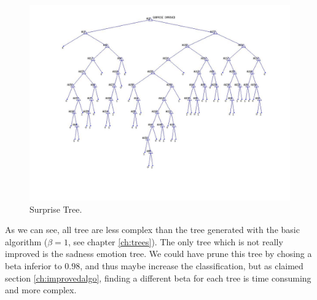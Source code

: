 \documentclass[a4paper,12pt,oneside,final]{report}
\newenvironment{changemargin}[2]{\begin{list}{}{%
\setlength{\topsep}{0pt}%
\setlength{\leftmargin}{0pt}%
\setlength{\rightmargin}{0pt}%
\setlength{\listparindent}{\parindent}%
\setlength{\itemindent}{\parindent}%
\setlength{\parsep}{0pt plus 1pt}%
\addtolength{\leftmargin}{#1}%
\addtolength{\rightmargin}{#2}%
}\item }{\end{list}}
\begin{document}
\begin{appendices}
\begin{figure}[!h]
\begin{changemargin}{-25mm}{-25mm}
\center
\includegraphics[scale=0.5]{surprise_improved.jpg}
\caption{Surprise Tree.}
\end{changemargin}
\end{figure}
\FloatBarrier
As we can see, all tree are less complex than the tree generated with the basic algorithm ($\beta = 1$, see chapter \ref{ch:trees}). The only tree which is not really improved is the sadness emotion tree. We could have prune this tree by chosing a beta inferior to $0.98$, and thus maybe increase the classification, but as claimed section \ref{ch:improvedalgo}, finding a different beta for each tree is time consuming and more complex.
\end{appendices}
\end{document}
